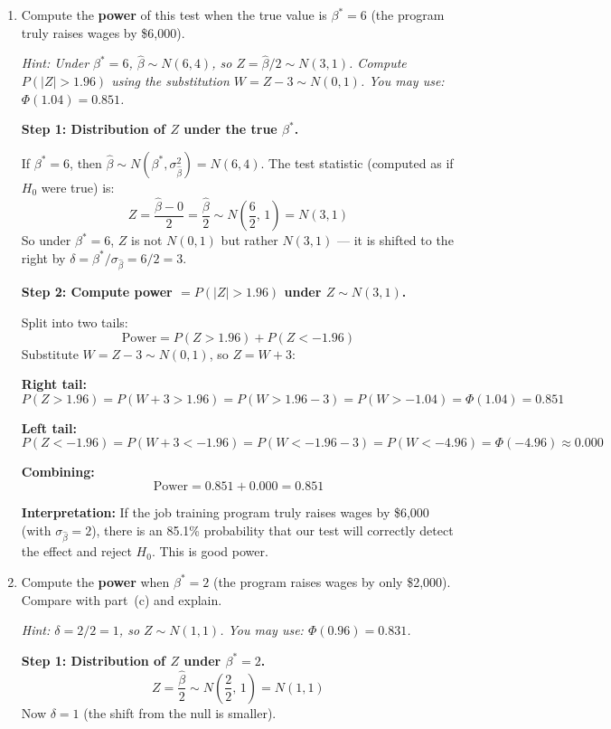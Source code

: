 \documentclass[11pt,a4paper]{article}
\begin{document}
\begin{enumerate}[label=(\alph*)]
\item Compute the \textbf{power} of this test when the true value is $\beta^* = 6$ (the program truly raises wages by \$6{,}000).

\textcolor{hintcolor}{\emph{Hint: Under $\beta^* = 6$, $\hat{\beta} \sim N(6, 4)$, so $Z = \hat{\beta}/2 \sim N(3, 1)$. Compute $P(|Z| > 1.96)$ using the substitution $W = Z - 3 \sim N(0,1)$. You may use: $\Phi(1.04) = 0.851$.}}

\begin{solution}
\textbf{Step 1: Distribution of $Z$ under the true $\beta^*$.}

If $\beta^* = 6$, then $\hat{\beta} \sim N(\beta^*, \sigma_{\hat{\beta}}^2) = N(6, 4)$. The test statistic (computed as if $H_0$ were true) is:
\[
  Z = \frac{\hat{\beta} - 0}{2} = \frac{\hat{\beta}}{2} \sim N\!\left(\frac{6}{2},\, 1\right) = N(3, 1)
\]
So under $\beta^* = 6$, $Z$ is not $N(0,1)$ but rather $N(3, 1)$ --- it is shifted to the right by $\delta = \beta^*/\sigma_{\hat{\beta}} = 6/2 = 3$.

\textbf{Step 2: Compute power $= P(|Z| > 1.96)$ under $Z \sim N(3, 1)$.}

Split into two tails:
\[
  \text{Power} = P(Z > 1.96) + P(Z < -1.96)
\]
Substitute $W = Z - 3 \sim N(0,1)$, so $Z = W + 3$:

\textbf{Right tail:}
\[
  P(Z > 1.96) = P(W + 3 > 1.96) = P(W > 1.96 - 3) = P(W > -1.04) = \Phi(1.04) = 0.851
\]

\textbf{Left tail:}
\[
  P(Z < -1.96) = P(W + 3 < -1.96) = P(W < -1.96 - 3) = P(W < -4.96) = \Phi(-4.96) \approx 0.000
\]

\textbf{Combining:}
\[
  \text{Power} = 0.851 + 0.000 = \boxed{0.851}
\]

\textbf{Interpretation:} If the job training program truly raises wages by \$6{,}000 (with $\sigma_{\hat{\beta}} = 2$), there is an 85.1\% probability that our test will correctly detect the effect and reject $H_0$. This is good power.
\end{solution}

\item Compute the \textbf{power} when $\beta^* = 2$ (the program raises wages by only \$2{,}000). Compare with part~(c) and explain.

\textcolor{hintcolor}{\emph{Hint: $\delta = 2/2 = 1$, so $Z \sim N(1,1)$. You may use: $\Phi(0.96) = 0.831$.}}

\begin{solution}
\textbf{Step 1: Distribution of $Z$ under $\beta^* = 2$.}
\[
  Z = \frac{\hat{\beta}}{2} \sim N\!\left(\frac{2}{2},\, 1\right) = N(1, 1)
\]
Now $\delta = 1$ (the shift from the null is smaller).


\end{solution}
\end{enumerate}
\end{document}
